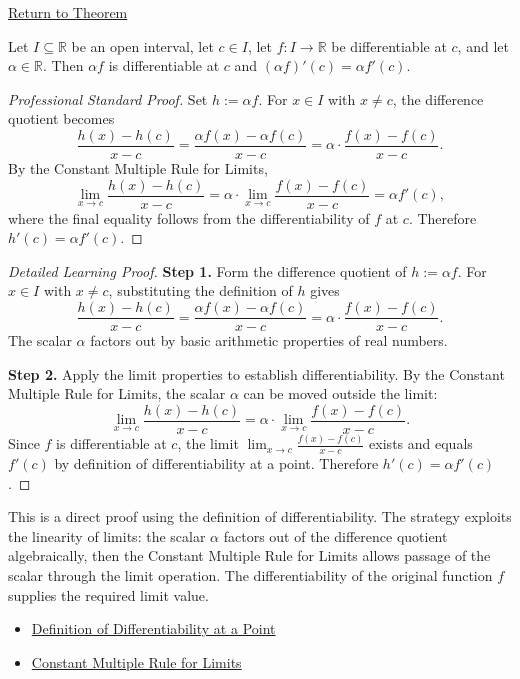 \newpage
{}
\label{prf:constant-multiple}

\begin{remark*}[Return]
\hyperref[thm:constant-multiple-rule]{Return to Theorem}
\end{remark*}

\begin{theorem*}
Let $I \subseteq \mathbb{R}$ be an open interval, let $c \in I$, let $f : I \to \mathbb{R}$ be differentiable at $c$, and let $\alpha \in \mathbb{R}$. Then $\alpha f$ is differentiable at $c$ and $(\alpha f)'(c) = \alpha f'(c)$.
\end{theorem*}

\begin{proof}[Professional Standard Proof]
\LRAProofBodyStart
Set $h := \alpha f$. For $x \in I$ with $x \neq c$, the difference quotient becomes
\[
  \frac{h(x) - h(c)}{x - c} = \frac{\alpha f(x) - \alpha f(c)}{x - c} = \alpha \cdot \frac{f(x) - f(c)}{x - c}.
\]
By the Constant Multiple Rule for Limits,
\[
  \lim_{x \to c} \frac{h(x) - h(c)}{x - c} = \alpha \cdot \lim_{x \to c} \frac{f(x) - f(c)}{x - c} = \alpha f'(c),
\]
where the final equality follows from the differentiability of $f$ at $c$. Therefore $h'(c) = \alpha f'(c)$.
\end{proof}

\begin{proof}[Detailed Learning Proof]
\LRAProofBodyStart

\textbf{Step 1.} Form the difference quotient of $h := \alpha f$. For $x \in I$ with $x \neq c$, substituting the definition of $h$ gives
\[
  \frac{h(x) - h(c)}{x - c} = \frac{\alpha f(x) - \alpha f(c)}{x - c} = \alpha \cdot \frac{f(x) - f(c)}{x - c}.
\]
The scalar $\alpha$ factors out by basic arithmetic properties of real numbers.

\textbf{Step 2.} Apply the limit properties to establish differentiability. By the Constant Multiple Rule for Limits, the scalar $\alpha$ can be moved outside the limit:
\[
  \lim_{x \to c} \frac{h(x) - h(c)}{x - c} = \alpha \cdot \lim_{x \to c} \frac{f(x) - f(c)}{x - c}.
\]
Since $f$ is differentiable at $c$, the limit $\lim_{x \to c} \frac{f(x) - f(c)}{x - c}$ exists and equals $f'(c)$ by definition of differentiability at a point. Therefore $h'(c) = \alpha f'(c)$.
\end{proof}

\begin{remark*}
This is a direct proof using the definition of differentiability. The strategy exploits the linearity of limits: the scalar $\alpha$ factors out of the difference quotient algebraically, then the Constant Multiple Rule for Limits allows passage of the scalar through the limit operation. The differentiability of the original function $f$ supplies the required limit value.
\end{remark*}

\begin{dependencies}
\begin{itemize}
  \item \hyperref[def:derivative-at-a-point]{Definition of Differentiability at a Point}
  \item \hyperref[thm:limit-scalar-multiple]{Constant Multiple Rule for Limits}
\end{itemize}
\end{dependencies}

\clearpage
